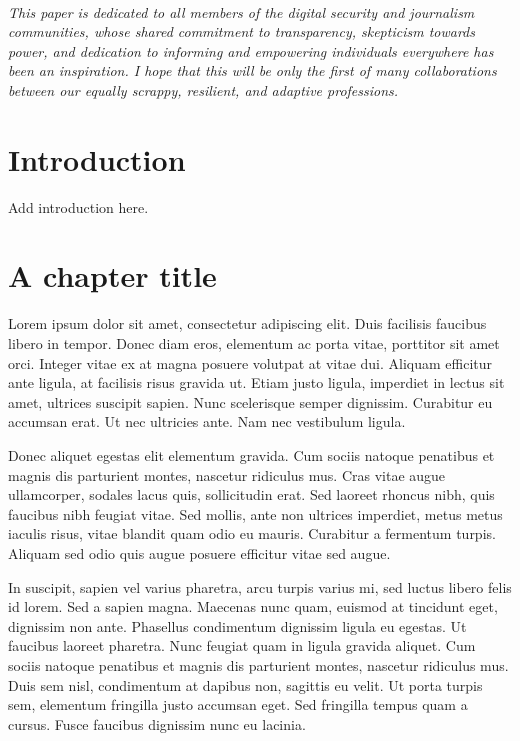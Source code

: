 \documentclass{tufte-book}
\begin{document}
\cleardoublepage
~\vfill
\begin{doublespace}
\noindent\fontsize{16}{18}\selectfont\itshape
\nohyphenation
This paper is dedicated to all members of the digital security and journalism communities, whose shared commitment to transparency, skepticism towards power, and dedication to informing and empowering individuals everywhere has been an inspiration. I hope that this will be only the first of many collaborations between our equally scrappy, resilient, and adaptive professions. 
\end{doublespace}
\vfill
\vfill


\cleardoublepage
\chapter*{Introduction}

Add introduction here.


\mainmatter

\chapter{A chapter title}
 Lorem ipsum dolor sit amet, consectetur adipiscing elit. Duis facilisis faucibus libero in tempor. Donec diam eros, elementum ac porta vitae, porttitor sit amet orci. Integer vitae ex at magna posuere volutpat at vitae dui. Aliquam efficitur ante ligula, at facilisis risus gravida ut. Etiam justo ligula, imperdiet in lectus sit amet, ultrices suscipit sapien. Nunc scelerisque semper dignissim. Curabitur eu accumsan erat. Ut nec ultricies ante. Nam nec vestibulum ligula.

Donec aliquet egestas elit elementum gravida. Cum sociis natoque penatibus et magnis dis parturient montes, nascetur ridiculus mus. Cras vitae augue ullamcorper, sodales lacus quis, sollicitudin erat. Sed laoreet rhoncus nibh, quis faucibus nibh feugiat vitae. Sed mollis, ante non ultrices imperdiet, metus metus iaculis risus, vitae blandit quam odio eu mauris. Curabitur a fermentum turpis. Aliquam sed odio quis augue posuere efficitur vitae sed augue\cite{Tufte2006}.

In suscipit, sapien vel varius pharetra, arcu turpis varius mi, sed luctus libero felis id lorem. Sed a sapien magna. Maecenas nunc quam, euismod at tincidunt eget, dignissim non ante. Phasellus condimentum dignissim ligula eu egestas. Ut faucibus laoreet pharetra. Nunc feugiat quam in ligula gravida aliquet. Cum sociis natoque penatibus et magnis dis parturient montes, nascetur ridiculus mus. Duis sem nisl, condimentum at dapibus non, sagittis eu velit. Ut porta turpis sem, elementum fringilla justo accumsan eget. Sed fringilla tempus quam a cursus. Fusce faucibus dignissim nunc eu lacinia. 





\backmatter






\printindex
\end{document}
